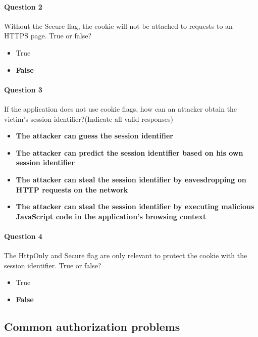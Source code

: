 \documentclass[titlepage]{article}
\begin{document}
    \paragraph{Question 2} Without the Secure flag, the cookie will not be attached to requests to an HTTPS page. True or false?
    \begin{itemize}
        \item True
        \item \textbf{False} \checkmark
    \end{itemize}
    \paragraph{Question 3} If the application does not use cookie flags, how can an attacker obtain the victim's session identifier?(Indicate all valid responses)
    \begin{itemize}
        \item \textbf{The attacker can guess the session identifier} \checkmark
        \item \textbf{The attacker can predict the session identifier based on his own session identifier} \checkmark
        \item \textbf{The attacker can steal the session identifier by eavesdropping on HTTP requests on the network} \checkmark
        \item \textbf{The attacker can steal the session identifier by executing malicious JavaScript code in the application's browsing context} \checkmark
    \end{itemize}
    \paragraph{Question 4} The HttpOnly and Secure flag are only relevant to protect the cookie with the session identifier. True or false?
    \begin{itemize}
        \item True
        \item \textbf{False} \checkmark
    \end{itemize}
    \subsection{Common authorization problems}
\end{document}
